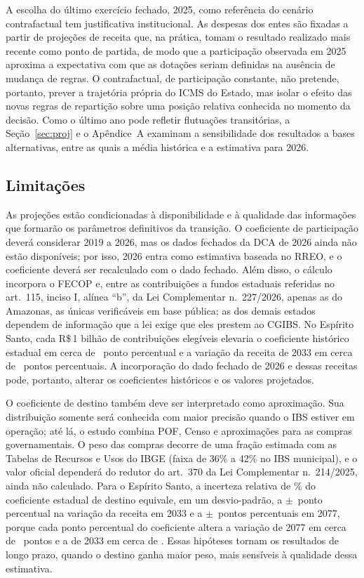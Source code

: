 \documentclass[12pt,a4paper]{article}
\newcommand{\Rs}{R\$\,}
\newcommand{\nn}{n.\textordmasculine}
\begin{document}
A escolha do último exercício fechado, 2025, como referência do cenário contrafactual tem justificativa institucional. As despesas dos entes são fixadas a partir de projeções de receita que, na prática, tomam o resultado realizado mais recente como ponto de partida, de modo que a participação observada em 2025 aproxima a expectativa com que as dotações seriam definidas na ausência de mudança de regras. O contrafactual, de participação constante, não pretende, portanto, prever a trajetória própria do ICMS do Estado, mas isolar o efeito das novas regras de repartição sobre uma posição relativa conhecida no momento da decisão. Como o último ano pode refletir flutuações transitórias, a Seção~\ref{sec:proj} e o Apêndice~A examinam a sensibilidade dos resultados a bases alternativas, entre as quais a média histórica e a estimativa para 2026.

\subsection{Limitações}\label{sec:lim}

As projeções estão condicionadas à disponibilidade e à qualidade das informações que formarão os parâmetros definitivos da transição. O coeficiente de participação deverá considerar 2019 a 2026, mas os dados fechados da DCA de 2026 ainda não estão disponíveis; por isso, 2026 entra como estimativa baseada no RREO, e o coeficiente deverá ser recalculado com o dado fechado. Além disso, o cálculo incorpora o FECOP e, entre as contribuições a fundos estaduais referidas no art.~115, inciso I, alínea ``b'', da Lei Complementar \nn~227/2026, apenas as do Amazonas, as únicas verificáveis em base pública; as dos demais estados dependem de informação que a lei exige que eles prestem ao CGIBS. No Espírito Santo, cada \Rs 1 bilhão de contribuições elegíveis elevaria o coeficiente histórico estadual em cerca de \NumFundosCoefPP\ ponto percentual e a variação da receita de 2033 em cerca de \NumFundosPP\ pontos percentuais. A incorporação do dado fechado de 2026 e dessas receitas pode, portanto, alterar os coeficientes históricos e os valores projetados.

O coeficiente de destino também deve ser interpretado como aproximação. Sua distribuição somente será conhecida com maior precisão quando o IBS estiver em operação; até lá, o estudo combina POF, Censo e aproximações para as compras governamentais. O peso das compras decorre de uma fração estimada com as Tabelas de Recursos e Usos do IBGE (faixa de 36\% a 42\% no IBS municipal), e o valor oficial dependerá do redutor do art.~370 da Lei Complementar \nn~214/2025, ainda não calculado. Para o Espírito Santo, a incerteza relativa de \NumIncert\% do coeficiente estadual de destino equivale, em um desvio-padrão, a $\pm$\NumDestTrintaTres\ ponto percentual na variação da receita em 2033 e a $\pm$\NumDestSetentaSete\ pontos percentuais em 2077, porque cada ponto percentual do coeficiente altera a variação de 2077 em cerca de \NumDestPPSetentaSete\ pontos e a de 2033 em cerca de \NumDestPPTrintaTres. Essas hipóteses tornam os resultados de longo prazo, quando o destino ganha maior peso, mais sensíveis à qualidade dessa estimativa.
\end{document}
